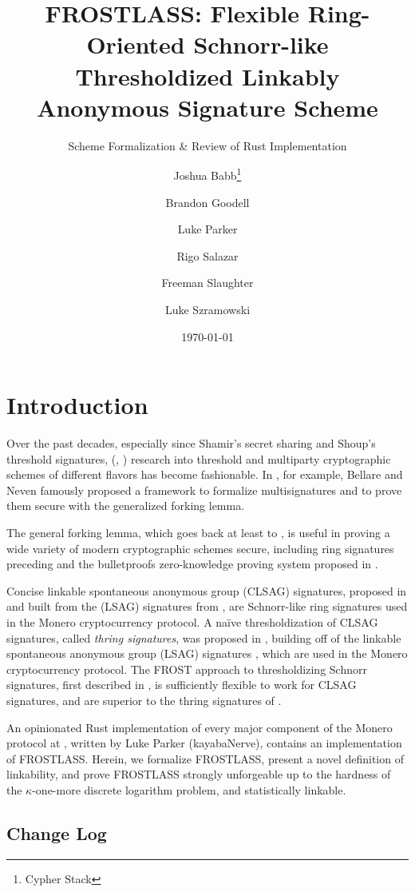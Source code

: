 \documentclass[11pt]{article}
\title{FROSTLASS: Flexible Ring-Oriented Schnorr-like Thresholdized Linkably Anonymous Signature Scheme}
\subtitle{Scheme Formalization \& Review of Rust Implementation}
\author{
    Joshua Babb\thanks{Cypher Stack} \\ %
    \and
    Brandon Goodell\protect\footnotemark[1] \\ %
    \and
    Luke Parker \\
    \and 
    Rigo Salazar\protect\footnotemark[1] \\ %
    \and
    Freeman Slaughter\protect\footnotemark[1] \\
    \and 
    Luke Szramowski\protect\footnotemark[1]
}
\date{\today}
\theoremstyle{definition}
\begin{document}
\maketitle

\section{Introduction}

Over the past decades, especially since Shamir's secret sharing and Shoup's threshold signatures, (\cite{shamir1979share}, \cite{shoup2000practical}) research into threshold and multiparty cryptographic schemes of different flavors has become fashionable. In \cite{bellare2006multi}, for example, Bellare and Neven famously proposed a framework to formalize multisignatures and to prove them secure with the generalized forking lemma. 

The general forking lemma, which goes back at least to \cite{li1988analysis}, is useful in proving a wide variety of modern cryptographic schemes secure, including ring signatures preceding \cite{zhang2002id} and the bulletproofs zero-knowledge proving system proposed in \cite{bunz2018bulletproofs}. 

Concise linkable spontaneous anonymous group (CLSAG) signatures, proposed in \cite{clsag} and built from the (LSAG) signatures from \cite{liu2004linkable}, are Schnorr-like ring signatures used in the Monero cryptocurrency protocol.
A na\"{i}ve thresholdization of CLSAG signatures, called \textit{thring signatures}, was proposed in \cite{goodell2018thring}, building off of the linkable spontaneous anonymous group (LSAG) signatures , which are used in the Monero cryptocurrency protocol. The FROST approach to thresholdizing Schnorr signatures, first described in \cite{komlo2021frost}, is sufficiently flexible to work for CLSAG signatures, and are superior to the thring signatures of \cite{goodell2018thring}.

An opinionated Rust implementation of every major component of the Monero protocol at \cite{SeraiRepo}, written by Luke Parker (kayabaNerve), contains an implementation of FROSTLASS. Herein, we formalize FROSTLASS, present a novel definition of linkability, and prove FROSTLASS strongly unforgeable up to the hardness of the $\kappa$-one-more discrete logarithm problem, and statistically linkable.

\subsection{Change Log}
\end{document}
